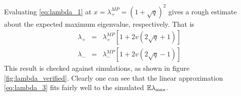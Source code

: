 \documentclass{article}
\begin{document}
Evaluating \eqref{eq:lambda_1} at $x = \lambda^{MP}_{+} = (1 +
\sqrt{q})^2$ gives a rough estimate about the expected maximum
eigenvalue, respectively. That is
\begin{eqnarray}
  \lambda_{+} &=& \lambda_{+}^{MP} [1+2v(2\sqrt q +
  1)] \label{eq:lambda_3} \\
  \lambda_{-} &=& \lambda_{-}^{MP} [1+2v(2\sqrt q -
  1)] \label{eq:lambda_4}
\end{eqnarray}
This result is checked against simulations, as shown in figure
\ref{fig:lambda_verified}. Clearly one can see that the linear
approximation \eqref{eq:lambda_3} fits fairly well to the simulated
$\mathbb{E} \lambda_{\text{max}}$.
\begin{figure}[htb!]
  \centering
\end{figure}
\end{document}
